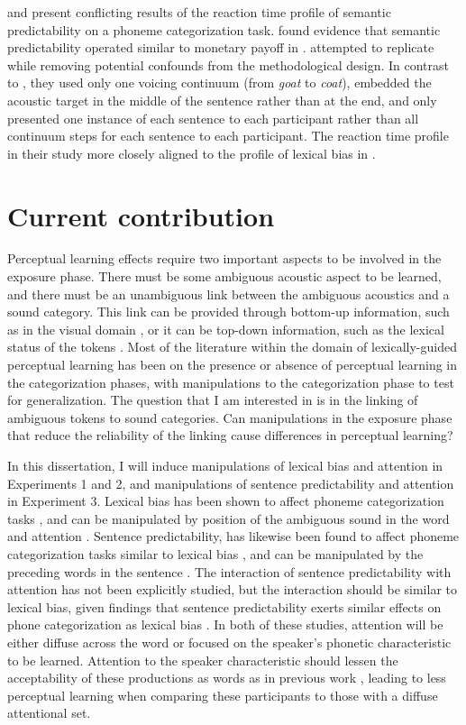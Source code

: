 \citet{Connine1987} and \citet{Borsky1998} present conflicting results of the reaction time profile of semantic predictability on a phoneme categorization task.
\citet{Connine1987} found evidence that semantic predictability operated similar to monetary payoff in \citet{Connine1987a}.  \citet{Borsky1998} attempted to replicate \citet{Connine1987} while removing potential confounds from the methodological design.  In contrast to \citet{Connine1987}, they used only one voicing continuum (from \emph{goat} to \emph{coat}), embedded the acoustic target in the middle of the sentence rather than at the end, and only presented one instance of each sentence to each participant rather than all continuum steps for each sentence to each participant.  The reaction time profile in their study more closely aligned to the profile of lexical bias in \citet{Connine1987a}.

\section{Current contribution}

Perceptual learning effects require two important aspects to be involved in the exposure phase.  
There must be some ambiguous acoustic aspect to be learned, and there must be an unambiguous link between the ambiguous acoustics and a sound category. 
This link can be provided through bottom-up information, such as in the visual domain \citep{Bertelson2003}, or it can be top-down information, such as the lexical status of the tokens \citep{Norris2003}. 
Most of the literature within the domain of lexically-guided perceptual learning has been on the presence or absence of perceptual learning in the categorization phases, with manipulations to the categorization phase to test for generalization.  
The question that I am interested in is in the linking of ambiguous tokens to sound categories.  
Can manipulations in the exposure phase that reduce the reliability of the linking cause differences in perceptual learning?

In this dissertation,  I will induce manipulations of lexical bias and attention in Experiments 1 and 2, and manipulations of sentence predictability and attention in Experiment 3. 
Lexical bias has been shown to affect phoneme categorization tasks \citep{Ganong1980}, and can be manipulated by position of the ambiguous sound in the word and attention \citep{Pitt2012}.  
Sentence predictability, has likewise been found to affect phoneme categorization tasks similar to lexical bias \citep{Borsky1998}, and can be manipulated by the preceding words in the sentence \citep{Kalikow1977}.  
The interaction of sentence predictability with attention has not been explicitly studied, but the interaction should be similar to lexical bias, given findings that sentence predictability exerts similar effects on phone categorization as lexical bias \citep{Borsky1998}.  In both of these studies, attention will be either diffuse across the word or focused on the speaker's phonetic characteristic to be learned.  Attention to the speaker characteristic should lessen the acceptability of these productions as words as in previous work \citep{Pitt2012}, leading to less perceptual learning when comparing these participants to those with a diffuse attentional set.
